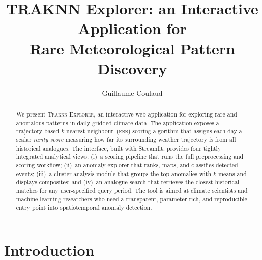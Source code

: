 \documentclass[runningheads]{llncs}
\begin{document}
\title{TRAKNN Explorer: an Interactive Application for\\
Rare Meteorological Pattern Discovery}


\author{%
  Guillaume Coulaud
}



\maketitle

\begin{abstract}
We present \textsc{Traknn Explorer}, an interactive web application for
exploring rare and anomalous patterns in daily gridded climate data.
The application exposes a trajectory-based $k$-nearest-neighbour~(\textsc{knn})
scoring algorithm that assigns each day a scalar \emph{rarity score}
measuring how far its surrounding weather trajectory is from all
historical analogues.
The interface, built with Streamlit, provides four tightly integrated
analytical views: (i)~a scoring pipeline that runs the full
preprocessing and scoring workflow; (ii)~an anomaly explorer that ranks,
maps, and classifies detected events; (iii)~a cluster analysis module
that groups the top anomalies with $k$-means and displays composites; and
(iv)~an analogue search that retrieves the closest historical matches for
any user-specified query period.
The tool is aimed at climate scientists and machine-learning researchers
who need a transparent, parameter-rich, and reproducible entry point into
spatiotemporal anomaly detection.
\end{abstract}


\section{Introduction}
\label{sec:intro}
\end{document}

